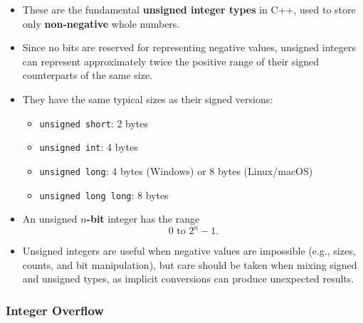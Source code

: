 \documentclass[10pt]{article}
\begin{document}
\begin{itemize}
    \item These are the fundamental \textbf{unsigned integer types} in C++, used to store only \textbf{non-negative} whole numbers.
    \item Since no bits are reserved for representing negative values, unsigned integers can represent approximately twice the positive range of their signed counterparts of the same size.
    \item They have the same typical sizes as their signed versions:
    \begin{itemize}
        \item \verb|unsigned short|: 2 bytes
        \item \verb|unsigned int|: 4 bytes
        \item \verb|unsigned long|: 4 bytes (Windows) or 8 bytes (Linux/macOS)
        \item \verb|unsigned long long|: 8 bytes
    \end{itemize}
    \item An unsigned \textbf{\(n\)-bit} integer has the range
    \[
        0 \text{ to } 2^n - 1.
    \]
    \item Unsigned integers are useful when negative values are impossible (e.g., sizes, counts, and bit manipulation), but care should be taken when mixing signed and unsigned types, as implicit conversions can produce unexpected results.
\end{itemize}

\newpage

\subsubsection{Integer Overflow}
\end{document}
